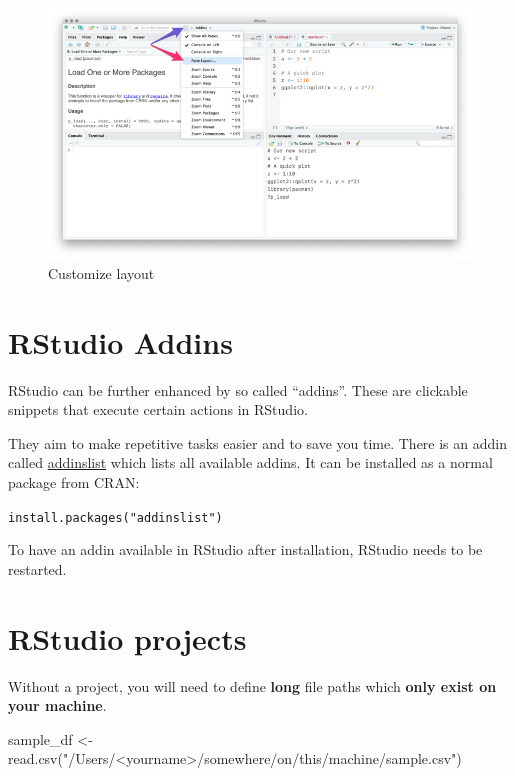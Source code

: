 \documentclass[]{book}
\newenvironment{Shaded}{}{}
\newcommand{\KeywordTok}[1]{\textcolor[rgb]{0.00,0.00,1.00}{#1}}
\newcommand{\NormalTok}[1]{#1}
\newcommand{\StringTok}[1]{\textcolor[rgb]{0.00,0.50,0.50}{#1}}
\begin{document}
\begin{figure}
\centering
\includegraphics{img/rstudio_layout.png}
\caption{Customize layout}
\end{figure}

\hypertarget{rstudio-addins}{%
\section{RStudio Addins}\label{rstudio-addins}}

RStudio can be further enhanced by so called ``addins''.
These are clickable snippets that execute certain actions in RStudio.

They aim to make repetitive tasks easier and to save you time.
There is an addin called \href{https://github.com/daattali/addinslist}{addinslist} which lists all available addins.
It can be installed as a normal package from CRAN:

\texttt{install.packages("addinslist")}

To have an addin available in RStudio after installation, RStudio needs to be restarted.

\hypertarget{rstudio-projects}{%
\section{RStudio projects}\label{rstudio-projects}}

Without a project, you will need to define \textbf{long} file paths which \textbf{only exist on your machine}.

\begin{Shaded}
\begin{Highlighting}[]
\NormalTok{sample_df <-}\StringTok{ }\KeywordTok{read.csv}\NormalTok{(}\StringTok{"/Users/<yourname>/somewhere/on/this/machine/sample.csv"}\NormalTok{)}
\end{Highlighting}
\end{Shaded}
\end{document}

